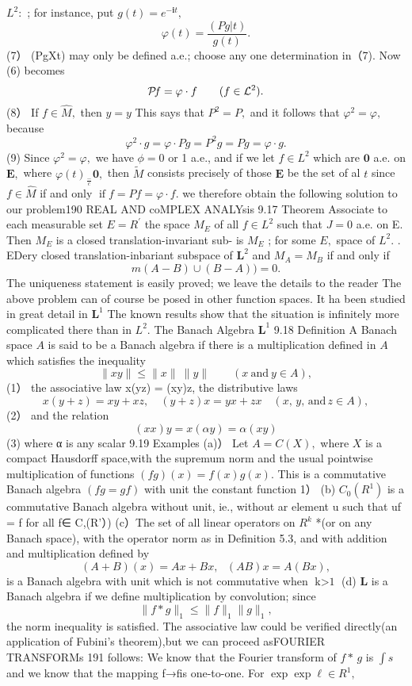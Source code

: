 $L^{2}{\mathrm{:}}$ ; for instance, put $g(t)=e^{-\mathbf{i}t},$ $$ \varphi(t)={\frac{(P g|t)}{g(t)}}. $$ (7） (PgXt) may only be defined a.e.; choose any one determination in（7). Now (6) becomes $$ {\cal P}\!f=\varphi\cdot f\qquad(f\in{\cal L}^{2}). $$ (8） If $f\in{\widehat{M}},$ then $\scriptstyle{y=y}$ This says that $P^{2}=P,$ and it follows that $\varphi^{2}=\varphi,$ because $$ \varphi^{2}\cdot g=\varphi\cdot P g=P^{2}g=P g=\varphi\cdot g. $$ (9) Since $\varphi^{2}=\varphi,$ we have $\scriptstyle\phi=0$ or 1 a.e., and if we let $f\in L^{2}$ which are $\mathbf{0}$ a.e. on ${\boldsymbol{E}},$ where $\varphi(t)_{\frac{-}{c}}^{}\mathbf{0},$ then $\tilde{M}$ consists precisely of those $\boldsymbol{E}$ be the set of al ${\mathbf{}}t$ since $f\in{\widehat{M}}$ if and only $\operatorname{if}f=P f=\varphi\cdot f.$ we therefore obtain the following solution to our problem190 REAL AND coMPLEX ANALYsis 9.17 Theorem Associate to each measurable set $E=R^{\prime}$ the space $M_{E}$ of all $f\in L^{2}$ such that $\scriptstyle{J=0}$ a.e. on E. Then $M_{E}$ is a closed translation-invariant sub- is $M_{E}$ ; for some $E,$ space of $L^{2}.$ . EDery closed translation-inbariant subspace of ${\boldsymbol{L}}^{2}$ and $M_{A}=M_{B}$ if and only if $$ m(A-B)\cup(B-A))=0. $$ The uniqueness statement is easily proved; we leave the details to the reader The above problem can of course be posed in other function spaces. It ha been studied in great detail in ${\boldsymbol{L}}^{1}$ The known results show that the situation is infinitely more complicated there than in $L^{2}.$ The Banach Algebra ${\boldsymbol{L}}^{1}$ 9.18 Definition A Banach space $\scriptstyle A$ is said to be a Banach algebra if there is a multiplication defined in $\scriptstyle A$ which satisfies the inequality $$ \|x y\|\leq\|x\|\ \|y\|\qquad(x{\mathrm{~and~}}y\in A), $$ (1） the associative law x(yz) = (xy)z, the distributive laws $$ x(y+z)=x y+x z,\quad(y+z)x=y x+z x\quad(x,\,y,\,\mathrm{and}\,z\in A), $$ (2） and the relation $$ (x x)y=x(\alpha y)=\alpha(x y) $$ (3) where α is any scalar 9.19 Examples (a)） Let $A=C(X),$ where $X$ is a compact Hausdorff space,with the supremum norm and the usual pointwise multiplication of functions $(f g)(x)=f(x)g(x).$ This is a commutative Banach algebra $(f g=g f)$ with unit the constant function 1） (b) $C_{0}(R^{1})$ is a commutative Banach algebra without unit, ie., without ar element u such that uf = f for all f∈ C,(R'）) (c）The set of all linear operators on $R^{k}$ *(or on any Banach space), with the operator norm as in Definition 5.3, and with addition and multiplication defined by $$ (A+B)(x)=A x+B x,\ \ \ (A B)x=A(B x), $$ is a Banach algebra with unit which is not commutative when $\operatorname{k>1}$ (d) ${\boldsymbol{L}}$ is a Banach algebra if we define multiplication by convolution; since $$ \|f\ast g\|_{1}\leq\|f\|_{1}\|g\|_{1}, $$ the norm inequality is satisfied. The associative law could be verified directly(an application of Fubini's theorem),but we can proceed asFOURIER TRANSFORMs 191 follows: We know that the Fourier transform of $f*\,g$ is $\textstyle\int\!s\,\ \,$ and we know that the mapping f→fis one-to-one. For $\textstyle\exp\exp\ell\in R^{1},$ $$ 